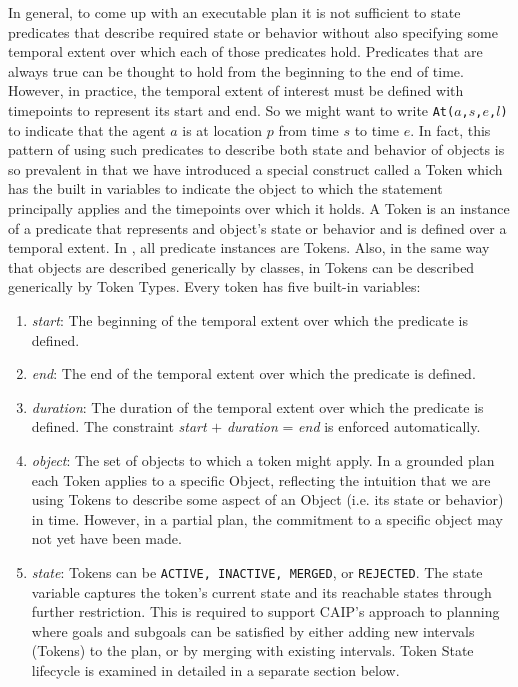 \begin{description}
  In general, to come up with an executable plan it is not sufficient
  to state predicates that describe required state or behavior without
  also specifying some temporal extent over which each of those
  predicates hold. Predicates that are always true can be thought to
  hold from the beginning to the end of time. However, in practice,
  the temporal extent of interest must be defined with timepoints to
  represent its start and end. So we might want to write
  \texttt{At($a$,$s$,$e$,$l$)} to indicate that the agent $a$ is at
  location $p$ from time $s$ to time $e$. In fact, this pattern of
  using such predicates to describe both state and behavior of objects
  is so prevalent in \eu that we have introduced a special construct
  called a Token which has the built in variables to indicate the
  object to which the statement principally applies and the timepoints
  over which it holds. A Token is an instance of a predicate that
  represents and object's state or behavior and is defined over a
  temporal extent. In \eu, all predicate instances are Tokens. Also,
  in the same way that objects are described generically by classes,
  in \eu Tokens can be described generically by Token Types. Every
  token has five built-in variables:

  \begin{enumerate}

  \item \textit {start}: The beginning of the temporal extent over
    which the predicate is defined.

  \item \textit {end}: The end of the temporal extent over which the
    predicate is defined.

  \item \textit {duration}: The duration of the temporal extent over
    which the predicate is defined. The constraint \textit{start} $+$
    \textit{duration} = \textit{end} is enforced automatically.

  \item \textit{object}: The set of objects to which a token might
    apply. In a grounded plan each Token applies to a specific Object,
    reflecting the intuition that we are using Tokens to describe some
    aspect of an Object (i.e. its state or behavior) in time. However,
    in a partial plan, the commitment to a specific object may not yet
    have been made.

  \item \textit{state}: Tokens can be \texttt{ACTIVE, INACTIVE,
      MERGED}, or \texttt{REJECTED}. The state variable captures the
    token's current state and its reachable states through further
    restriction.  This is required to support CAIP's approach to
    planning where goals and subgoals can be satisfied by either
    adding new intervals (Tokens) to the plan, or by merging with
    existing intervals. Token State lifecycle is examined in detailed
    in a separate section below.


\end{enumerate}
\end{description}
